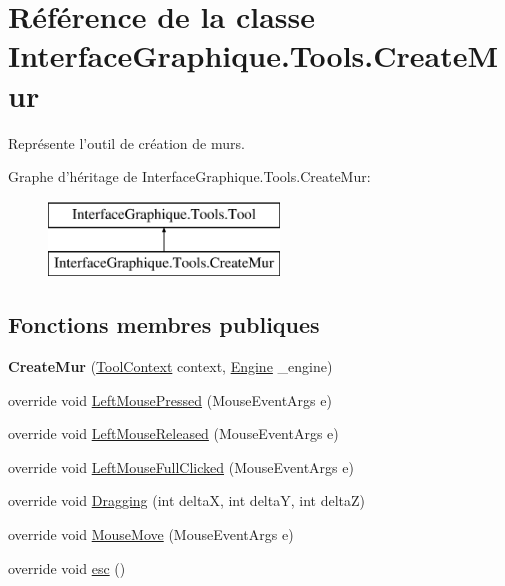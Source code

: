 \hypertarget{class_interface_graphique_1_1_tools_1_1_create_mur}{\section{Référence de la classe Interface\-Graphique.\-Tools.\-Create\-Mur}
\label{class_interface_graphique_1_1_tools_1_1_create_mur}
}


Représente l'outil de création de murs.  


Graphe d'héritage de Interface\-Graphique.\-Tools.\-Create\-Mur\-:\begin{figure}[H]
\begin{center}
\leavevmode
\includegraphics[height=2.000000cm]{class_interface_graphique_1_1_tools_1_1_create_mur}
\end{center}
\end{figure}
\subsection*{Fonctions membres publiques}
\begin{DoxyCompactItemize}
\item 
\hypertarget{class_interface_graphique_1_1_tools_1_1_create_mur_a6fe4de249c974c9a7838c673ab86ffb8}{{\bfseries Create\-Mur} (\hyperlink{class_interface_graphique_1_1_tools_1_1_tool_context}{Tool\-Context} context, \hyperlink{class_interface_graphique_1_1_engine}{Engine} \-\_\-engine)}\label{class_interface_graphique_1_1_tools_1_1_create_mur_a6fe4de249c974c9a7838c673ab86ffb8}

\item 
override void \hyperlink{class_interface_graphique_1_1_tools_1_1_create_mur_a79a1a1f1865df9234e4bd1415ed6b52f}{Left\-Mouse\-Pressed} (Mouse\-Event\-Args e)
\item 
override void \hyperlink{class_interface_graphique_1_1_tools_1_1_create_mur_a663d5c347bf63a1324605eb552c58a19}{Left\-Mouse\-Released} (Mouse\-Event\-Args e)
\item 
override void \hyperlink{class_interface_graphique_1_1_tools_1_1_create_mur_affaacf9919134693a0fc44fe246d4b8c}{Left\-Mouse\-Full\-Clicked} (Mouse\-Event\-Args e)
\item 
override void \hyperlink{class_interface_graphique_1_1_tools_1_1_create_mur_a7ffdf69b104fda7ebdaef67f9ac03582}{Dragging} (int delta\-X, int delta\-Y, int delta\-Z)
\item 
override void \hyperlink{class_interface_graphique_1_1_tools_1_1_create_mur_abe8d1a32d61c3057490450bf9ff2b17c}{Mouse\-Move} (Mouse\-Event\-Args e)
\item 
override void \hyperlink{class_interface_graphique_1_1_tools_1_1_create_mur_a26837d6c8d1fa58b035fb696396fc451}{esc} ()
\end{DoxyCompactItemize}
